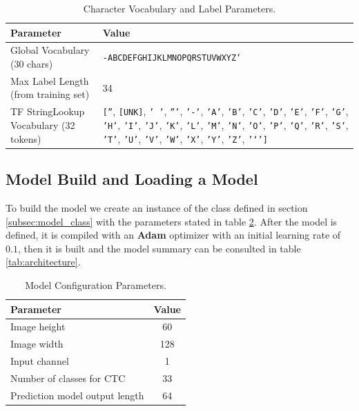 \documentclass[11pt,letterpaper]{article}
\begin{document}
	\begin{table}[!h]
		\centering
		\begin{tabular}{|l|p{10cm}|}
			\hline
			\textbf{Parameter} & \textbf{Value} \\
			\hline
			Global Vocabulary (30 chars) & \texttt{-ABCDEFGHIJKLMNOPQRSTUVWXYZ` } \\
			\hline
			Max Label Length (from training set) & 34 \\
			\hline
			TF StringLookup Vocabulary (32 tokens) &
			\texttt{[''}, \texttt{[UNK]}, \texttt{' '}, \texttt{'''}, \texttt{'-'}, \texttt{'A'}, \texttt{'B'}, \texttt{'C'}, \texttt{'D'}, \texttt{'E'}, \texttt{'F'}, \texttt{'G'}, \texttt{'H'}, \texttt{'I'}, \texttt{'J'}, \texttt{'K'}, \texttt{'L'}, \texttt{'M'}, \texttt{'N'}, \texttt{'O'}, \texttt{'P'}, \texttt{'Q'}, \texttt{'R'}, \texttt{'S'}, \texttt{'T'}, \texttt{'U'}, \texttt{'V'}, \texttt{'W'}, \texttt{'X'}, \texttt{'Y'}, \texttt{'Z'}, \texttt{'`']} \\
			\hline
		\end{tabular}
		\caption{Character Vocabulary and Label Parameters.}
		\label{tab:vocab_params}
	\end{table}
	
	\subsection{Model Build and Loading a Model}
	To build the model we create an instance of the class defined in section \ref{subsec:model_class} with the parameters stated in table \ref{tab:model_config}. After the model is defined, it is compiled with an \textbf{Adam} optimizer with an initial learning rate of $0.1$, then it is built and the model summary can be consulted in table \ref{tab:architecture}.
	
	\begin{table}[!h]
		\centering
		\begin{tabular}{|l|c|}
			\hline
			\textbf{Parameter} & \textbf{Value} \\
			\hline
			Image height & 60 \\
			Image width & 128 \\
			Input channel & 1 \\
			Number of classes for CTC & 33 \\
			Prediction model output length & 64 \\
			\hline
		\end{tabular}
		\caption{Model Configuration Parameters.}
		\label{tab:model_config}
	\end{table}
	
\end{document}
